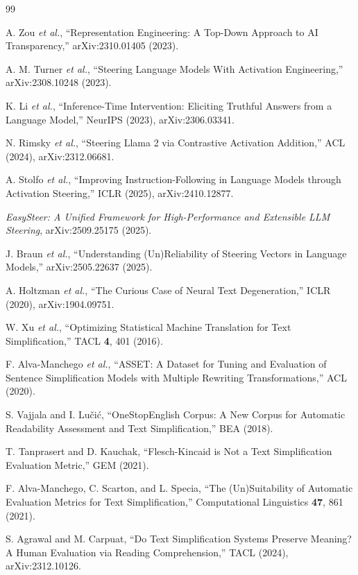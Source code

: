 \documentclass[aps,prb,reprint,nofootinbib,a4paper]{revtex4-2}
\begin{document}
\begin{thebibliography}{99}

 A. Zou \textit{et al.},
``Representation Engineering: A Top-Down Approach to AI Transparency,''
arXiv:2310.01405 (2023).

 A. M. Turner \textit{et al.},
``Steering Language Models With Activation Engineering,''
arXiv:2308.10248 (2023).

 K. Li \textit{et al.},
``Inference-Time Intervention: Eliciting Truthful Answers from a Language Model,''
NeurIPS (2023), arXiv:2306.03341.

 N. Rimsky \textit{et al.},
``Steering Llama 2 via Contrastive Activation Addition,''
ACL (2024), arXiv:2312.06681.

 A. Stolfo \textit{et al.},
``Improving Instruction-Following in Language Models through Activation Steering,''
ICLR (2025), arXiv:2410.12877.

 \textit{EasySteer: A Unified Framework for High-Performance
and Extensible LLM Steering}, arXiv:2509.25175 (2025).

 J. Braun \textit{et al.},
``Understanding (Un)Reliability of Steering Vectors in Language Models,''
arXiv:2505.22637 (2025).

 A. Holtzman \textit{et al.},
``The Curious Case of Neural Text Degeneration,''
ICLR (2020), arXiv:1904.09751.

 W. Xu \textit{et al.},
``Optimizing Statistical Machine Translation for Text Simplification,''
TACL \textbf{4}, 401 (2016).

 F. Alva-Manchego \textit{et al.},
``ASSET: A Dataset for Tuning and Evaluation of Sentence Simplification Models
with Multiple Rewriting Transformations,'' ACL (2020).

 S. Vajjala and I. Lu\v{c}i\'c,
``OneStopEnglish Corpus: A New Corpus for Automatic Readability Assessment and
Text Simplification,'' BEA (2018).

 T. Tanprasert and D. Kauchak,
``Flesch-Kincaid is Not a Text Simplification Evaluation Metric,''
GEM (2021).

 F. Alva-Manchego, C. Scarton, and L. Specia,
``The (Un)Suitability of Automatic Evaluation Metrics for Text Simplification,''
Computational Linguistics \textbf{47}, 861 (2021).

 S. Agrawal and M. Carpuat,
``Do Text Simplification Systems Preserve Meaning? A Human Evaluation via Reading
Comprehension,'' TACL (2024), arXiv:2312.10126.


\end{thebibliography}
\end{document}
